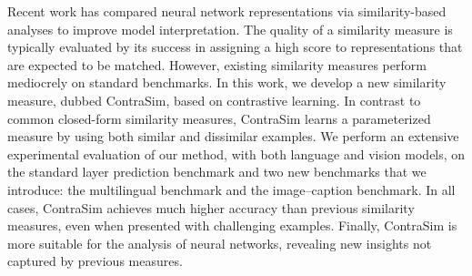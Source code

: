 Recent work has compared neural network representations via similarity-based analyses to improve model interpretation. The quality of a similarity measure is typically evaluated by its success in assigning a high score to representations that are expected to be matched. However, existing similarity measures perform mediocrely on standard benchmarks.  In this work, we develop a new similarity measure, dubbed ContraSim, based on contrastive learning. In contrast to common closed-form similarity measures, ContraSim learns a parameterized measure by using both similar and dissimilar examples.  We perform an extensive experimental evaluation of our method, with both language and vision models, on the standard layer prediction benchmark and two new benchmarks that we introduce: the multilingual benchmark and the image--caption benchmark. In all cases, ContraSim achieves much higher accuracy than previous similarity measures, even when presented with challenging examples. Finally, ContraSim is more suitable for the analysis of neural networks, revealing new insights not captured by previous measures.
